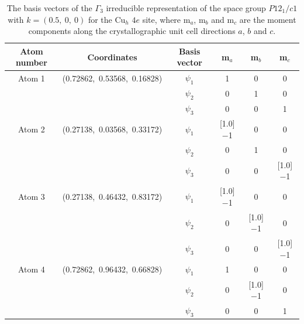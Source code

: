 \documentclass[
sn-mathphys,
Numbered,
onecolumn]
{sn-jnl}%
\newcommand{\minus}{\scalebox{0.75}[1.0]{$-$}}
\begin{document}
\begin{table}[ht!]
    \centering
    \begin{tabular}{c c c c c c} \hline \hline
      Atom number & Coordinates & {Basis vector} & {m$_a$} & m$_b$ &{m$_c$} \\ \hline
       Atom 1 & (0.72862,~0.53568,~0.16828) & $\psi_1$ & 1 & 0 & 0 \\ 
      & & $\psi_2$ & 0 & 1 &  0  \\
     & & $\psi_3$ & 0 & 0 & 1  \\
     Atom 2 & (0.27138,~0.03568,~0.33172) & $\psi_1$ & \minus 1 & 0 & 0 \\
    & & $\psi_2$ & 0 &  1 &  0  \\
     & & $\psi_3$ & 0 & 0 & \minus 1  \\ 
     Atom 3 & (0.27138,~0.46432,~0.83172) & $\psi_1$ & \minus 1 & 0 & 0 \\
    & & $\psi_2$ & 0 & \minus 1 &  0  \\
     & & $\psi_3$ & 0 & 0 & \minus 1  \\ 
     Atom 4 & (0.72862,~0.96432,~0.66828) & $\psi_1$ &  1 & 0 & 0 \\
    & & $\psi_2$ & 0 &  \minus 1 &  0  \\
     & & $\psi_3$ & 0 & 0 &  1 \\ 
       \hline \hline
   
\end{tabular}
    \caption{The basis vectors of the $\Gamma_3$ irreducible representation of the space group $P12_1/c1$ with ${k}=(0.5,~0,~0)$ for the Cu$_{h}$ $4e$ site, where m$_a$, m$_b$ and m$_c$ are the moment components along the crystallographic unit cell directions $a$, $b$ and $c$.}
    \label{avv_cuh_BVs_gamma3}
\end{table}
\end{document}
